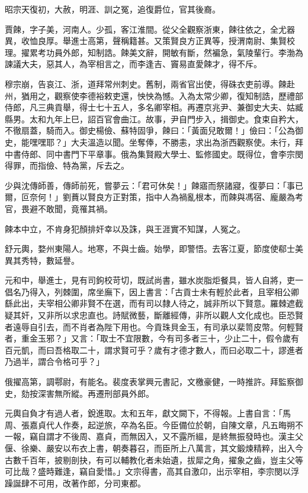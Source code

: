 \begin{pinyinscope}
 昭宗天復初，大赦，明涯、訓之冤，追復爵位，官其後裔。



 賈餗，字子美，河南人。少孤，客江淮間。從父全觀察浙東，餗往依之，全尤器異，收恤良厚。舉進士高第，聲稱籍甚。又策賢良方正異等，授渭南尉、集賢校理。擢累考功員外郎，知制誥。餗美文辭，開敏有斷，然褊急，氣陵輩行。李渤為諫議大夫，惡其人，為宰相言之，而李逢吉、竇易直愛餗才，得不斥。



 穆宗崩，告哀江、浙，道拜常州刺史。舊制，兩省官出使，得硃衣吏前導。餗赴州，猶用之，觀察使李德裕敕吏還，怏怏為憾。入為太常少卿，復知制誥，歷禮部侍郎，凡三典貢舉，得士七十五人，多名卿宰相。再遷京兆尹、兼御史大夫、姑臧縣男。太和九年上巳，詔百官會曲江。故事，尹自門步入，揖御史。食束自矜大，不徹扇蓋，騎而入。御史楊儉、蘇特固爭，餗曰：「黃面兒敢爾！」儉曰：「公為御史，能嘿嘿耶？」大夫溫造以聞。坐奪俸，不勝恚，求出為浙西觀察使。未行，拜中書侍郎、同中書門下平章事。俄為集賢殿大學士、監修國史。既得位，會李宗閔得罪，而指儉、特為黨，斥去之。



 少與沈傳師善，傳師前死，嘗夢云：「君可休矣！」餗寤而祭諸寢，復夢曰：「事已爾，叵奈何！」劉蕡以賢良方正對策，指中人為禍亂根本，而餗與馮宿、龐嚴為考官，畏避不敢聞，竟罹其禍。



 餗本中立，不肯身犯顏排奸幸以及誅，與王涯實不知謀，人冤之。



 舒元輿，婺州東陽人。地寒，不與士齒。始學，即警悟。去客江夏，節度使郗士美異其秀特，數延譽。



 元和中，舉進士，見有司鉤校苛切，既試尚書，雖水炭脂炬餐具，皆人自將，吏一倡名乃得入，列棘圍，席坐廡下，因上書言：「古貢士未有輕於此者，且宰相公卿繇此出，夫宰相公卿非賢不在選，而有司以隸人待之，誠非所以下賢意。羅棘遮截疑其奸，又非所以求忠直也。詩賦微藝，斷離經傳，非所以觀人文化成也。臣恐賢者遠辱自引去，而不肖者為陛下用也。今貢珠貝金玉，有司承以棐笥皮幣。何輕賢者，重金玉邪？」又言：「取士不宜限數，今有司多者三十，少止二十，假令歲有百元凱，而曰吾格取二十，謂求賢可乎？歲有才德才數人，而曰必取二十，謬進者乃過半，謂合令格可乎？」



 俄擢高第，調鄠尉，有能名。裴度表掌興元書記，文檄豪健，一時推許。拜監察御史，劾按深害無所縱。再遷刑部員外郎。



 元輿自負才有過人者，銳進取。太和五年，獻文闕下，不得報。上書自言：「馬周、張嘉貞代人作奏，起逆旅，卒為名臣。今臣備位於朝，自陳文章，凡五晦朔不一報，竊自謂才不後周、嘉貞，而無因入，又不露所縕，是終無振發時也。漢主父偃、徐樂、嚴安以布衣上書，朝奏暮召，而臣所上八萬言，其文鍛煉精粹，出入今古數千百年，披剔剖抉，有可以輔教化者未始遺，拔犀之角，擢象之齒，豈主父等可比哉？盛時難逢，竊自愛惜。」文宗得書，高其自激卬，出示宰相，李宗閔以浮躁誕肆不可用，改著作郎，分司東都。




\end{pinyinscope}
